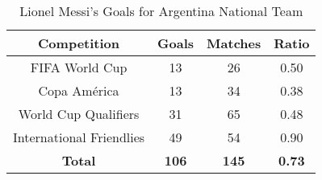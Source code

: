 \begin{table}[h!]
    \centering
    \caption{Lionel Messi's Goals for Argentina National Team}
    \label{tab:messi_argentina_goals}
    \begin{tabular}{cccc}
    \hline
    \textbf{Competition} & \textbf{Goals} & \textbf{Matches} & \textbf{Ratio} \\ \hline
    FIFA World Cup & 13 & 26 & 0.50 \\
    Copa América & 13 & 34 & 0.38 \\
    World Cup Qualifiers & 31 & 65 & 0.48 \\
    International Friendlies & 49 & 54 & 0.90 \\ \hline
    \textbf{Total} & \textbf{106} & \textbf{145} & \textbf{0.73} \\ \hline
    \end{tabular}
\end{table}
